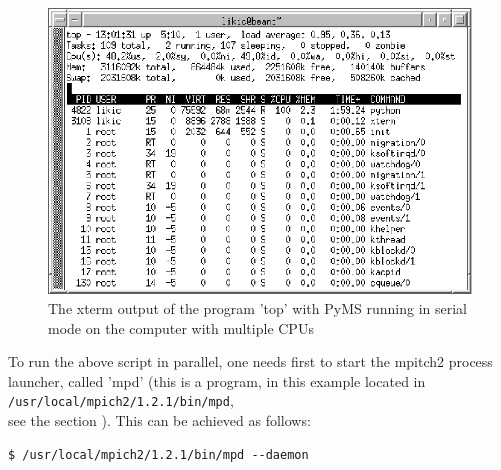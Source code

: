\begin{figure}
  \begin{center}
    \includegraphics[scale=1.0]{graphics/chapter08/top-serial.eps}
  \end{center}
  \caption{The xterm output of the program 'top' with PyMS running in
  serial mode on the computer with multiple CPUs}
  \label{fig:top-serial}
\end{figure}

To run the above script in parallel, one needs first to start the
mpitch2 process launcher, called 'mpd' (this is a program, in this
example located in\\
 {\tt /usr/local/mpich2/1.2.1/bin/mpd},\\
see the section \label{sec:mpitch2}). This can be achieved as follows:

\begin{verbatim}
$ /usr/local/mpich2/1.2.1/bin/mpd --daemon
\end{verbatim}

